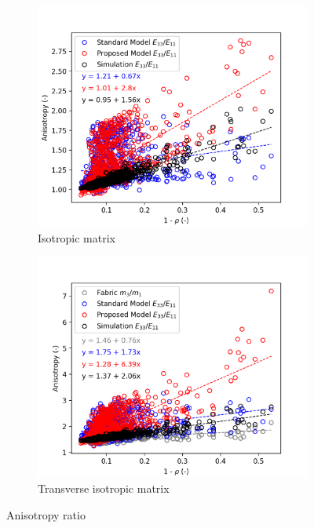 \documentclass[a4paper,fleqn]{DC_ArtStyle}
\begin{document}
\begin{figure}
\begin{subfigure}[b]{0.45\linewidth}
			\includegraphics[width=\linewidth]{Anisotropy_EIsotropic}
			\caption{Isotropic matrix}
		\end{subfigure}
		\begin{subfigure}[b]{0.45\linewidth}
			\includegraphics[width=\linewidth]{Anisotropy_ETransverse}
			\caption{Transverse isotropic matrix}
		\end{subfigure}
		\caption{Anisotropy ratio }
	\end{figure}
\end{document}
